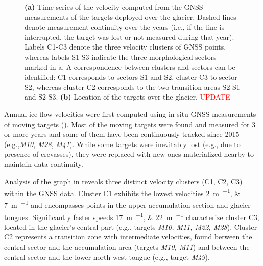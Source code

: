 \begin{figure}[ht!]
    \caption{\textbf{(a)} Time series of the velocity computed from the GNSS measurements of the targets deployed over the glacier. Dashed lines denote measurement continuity over the years (i.e., if the line is interrupted, the target was lost or not measured during that year). Labels C1-C3 denote the three velocity clusters of GNSS points, whereas labels S1-S3 indicate the three morphological sectors marked in a. A correspondence between clusters and sectors can be identified: C1 corresponds to sectors S1 and S2, cluster C3 to sector S2, whereas cluster C2 corresponds to the two transition areas S2-S1 and S2-S3. \textbf{(b)} Location of the targets over the glacier. \textcolor{red}{UPDATE}}
    \label{fig:3:GNSS_velocity}		
\end{figure}

Annual ice flow velocities were first computed using in-situ GNSS measurements of moving targets
().
Most of the moving targets were found and measured for 3 or more years and some of them have been continuously tracked since 2015 
(e.g.,\textit{M10}, \textit{M28}, \textit{M41}). 
While some targets were inevitably lost (e.g., due to presence of crevasses), they were replaced with new ones 
materialized nearby to maintain data continuity. 

Analysis of the graph in  reveals three distinct velocity clusters (C1, C2, C3) 
within the GNSS data.  
Cluster C1 exhibits the lowest velocities \qtylist{2;7}{\meter\per\year} and encompasses points in the upper 
accumulation section and glacier tongues. 
Significantly faster speeds \qtylist{17;22}{\meter\per\year} characterize cluster C3, located in the glacier's 
central part (e.g., targets \textit{M10, M11, M22, M28}). 
Cluster C2 represents a transition zone with intermediate velocities, found between the central sector 
and the accumulation area (targets \textit{M10, M11}) and between the central sector and the lower north-west tongue 
(e.g., target \textit{M49}).

